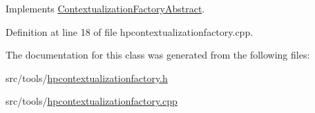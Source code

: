 Implements \mbox{\hyperlink{classContextualizationFactoryAbstract_a0898ad4d3a109c5767a1e596bf444e4a}{Contextualization\+Factory\+Abstract}}.



Definition at line 18 of file hpcontextualizationfactory.\+cpp.



The documentation for this class was generated from the following files\+:\begin{DoxyCompactItemize}
\item 
src/tools/\mbox{\hyperlink{hpcontextualizationfactory_8h}{hpcontextualizationfactory.\+h}}\item 
src/tools/\mbox{\hyperlink{hpcontextualizationfactory_8cpp}{hpcontextualizationfactory.\+cpp}}\end{DoxyCompactItemize}
